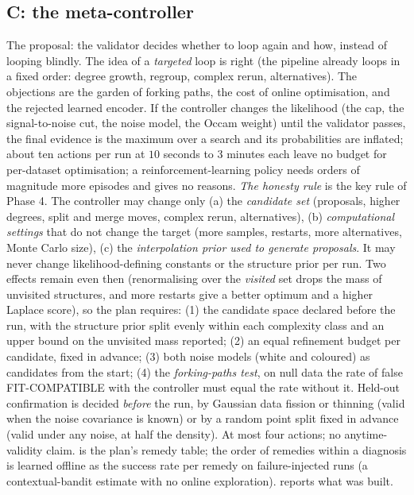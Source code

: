 \documentclass[11pt]{article}
\theoremstyle{plain}
\theoremstyle{definition}
\theoremstyle{remark}
\newcommand{\lab}[1]{\textsf{#1}}           %
\newcommand{\FC}{\lab{FIT-COMPATIBLE}}
\begin{document}
\subsection{C: the meta-controller}
The proposal: the validator decides whether to loop again and how, instead of looping blindly. The idea of a \emph{targeted} loop is right (the pipeline already loops in a fixed order: degree growth, regroup, complex rerun, alternatives). The objections are the garden of forking paths, the cost of online optimisation, and the rejected learned encoder.
If the controller changes the likelihood (the cap, the signal-to-noise cut, the noise model, the Occam weight) until the validator passes, the final evidence is the maximum over a search and its probabilities are inflated; about ten actions per run at $10$ seconds to $3$ minutes each leave no budget for per-dataset optimisation; a reinforcement-learning policy needs orders of magnitude more episodes and gives no reasons.
\emph{The honesty rule} is the key rule of Phase 4. The controller may change only (a) the \emph{candidate set} (proposals, higher degrees, split and merge moves, complex rerun, alternatives), (b) \emph{computational settings} that do not change the target (more samples, restarts, more alternatives, Monte Carlo size), (c) the \emph{interpolation prior used to generate proposals}.
It may never change likelihood-defining constants or the structure prior per run. Two effects remain even then (renormalising over the \emph{visited} set drops the mass of unvisited structures, and more restarts give a better optimum and a higher Laplace score), so the plan requires: (1) the candidate space declared before the run, with the structure prior split evenly within each complexity class and an upper bound on the unvisited mass reported;
(2) an equal refinement budget per candidate, fixed in advance; (3) both noise models (white and coloured) as candidates from the start; (4) the \emph{forking-paths test}, on null data the rate of false \FC{} with the controller must equal the rate without it. Held-out confirmation is decided \emph{before} the run, by Gaussian data fission or thinning (valid when the noise covariance is known) or by a random point split fixed in advance (valid under any noise, at half the density). At most four actions; no anytime-validity claim.
 is the plan's remedy table; the order of remedies within a diagnosis is learned offline as the success rate per remedy on failure-injected runs (a contextual-bandit estimate with no online exploration).  reports what was built.
\end{document}
